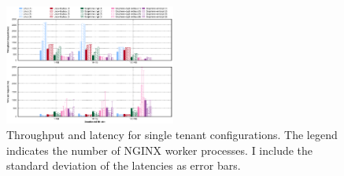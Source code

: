 \begin{figure}[t]
	\centering
    \includegraphics[width=0.5\textwidth]{figs/macrobench-single-tenant-lat-throughput}
	\caption{Throughput and latency for single tenant configurations.
    The legend indicates the number of NGINX worker processes.
    I include the standard deviation of the latencies as error bars.}
	\vspace*{-4pt}
    \label{fig:macrobench-single-tenant-lat-throughput}
\end{figure}
